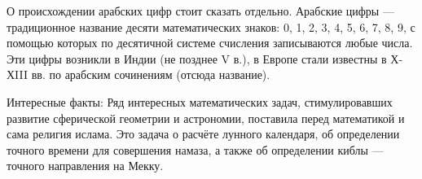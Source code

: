 О  происхождении  арабских цифр  стоит сказать отдельно.   Арабские  цифры — традиционное название  десяти математических знаков: 0, 1, 2, 3, 4, 5, 6, 7, 8, 9, с помощью которых  по десятичной системе счисления  записываются любые числа. Эти  цифры возникли в Индии (не  позднее V в.), в Европе стали  известны в Х-ХIII вв. по арабским сочинениям (отсюда название).  

Интересные  факты: Ряд интересных математических задач, стимулировавших развитие сферической геометрии и астрономии, поставила перед математикой и сама религия ислама. Это задача о расчёте лунного календаря, об определении точного времени для совершения намаза, а также об определении киблы — точного направления на Мекку.  

